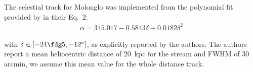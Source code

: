 The celestial track for Molonglo was implemented from the polynomial fit provided by \citet{Grillmair2017_south} in their 
Eq.~2:
\begin{eqnarray*}
\alpha = 345.017 - 0.5843\delta + 0.0182\delta^2
\end{eqnarray*}

with $\delta \in [-24\fdg5,-12^\circ]$, as explicitly reported by the authors. The authors report a mean heliocentric distance of 20~kpc for the stream and FWHM of 30 arcmin, we assume this mean value for the whole distance track. 
